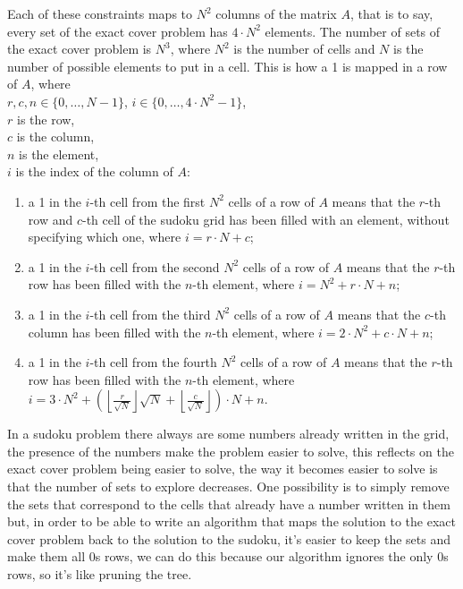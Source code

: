 \documentclass{beamer}
\begin{document}
\begin{frame}
    Each of these constraints maps to $N^2$ columns of the matrix $A$, that is to say,
    every set of the exact cover problem has $4\cdot N^2$ elements.
    The number of sets of the exact cover problem is $N^3$, where $N^2$ is the number of cells
    and $N$ is the number of possible elements to put in a cell.
    This is how a 1 is mapped in a row of $A$, where \\ 
    $r,c,n \in \{0,\dots,N-1\}$, $i \in \{0,\dots,4\cdot N^2-1\}$, \\
    $r$ is the row, \\
    $c$ is the column, \\
    $n$ is the element, \\
    $i$ is the index of the column of $A$:
\end{frame}
\begin{frame}    
    \begin{enumerate}
        \item a 1 in the $i$-th cell from the first $N^2$ cells of a row of $A$ means that
        the $r$-th row and $c$-th cell of the sudoku grid has been filled with an element, without specifying which one,
        where $i = r\cdot N + c$;
        \item a 1 in the $i$-th cell from the second $N^2$ cells of a row of $A$ means that
        the $r$-th row has been filled with the $n$-th element, where $i = N^2 + r\cdot N + n$;
        \item a 1 in the $i$-th cell from the third $N^2$ cells of a row of $A$ means that
        the $c$-th column has been filled with the $n$-th element, 
        where $i = 2\cdot N^2 + c\cdot N + n$;
        \item a 1 in the $i$-th cell from the fourth $N^2$ cells of a row of $A$ means that
        the $r$-th row has been filled with the $n$-th element,
        where $i = 3\cdot N^2 + \left(\left\lfloor\frac{r}{\sqrt{N}}\right\rfloor \sqrt{N}
        + \left\lfloor\frac{c}{\sqrt{N}}\right\rfloor\right)\cdot N + n$.
    \end{enumerate}
\end{frame}
\begin{frame}{}
    In a sudoku problem there always are some numbers already written in the grid,
    the presence of the numbers make the problem easier to solve, this reflects on the 
    exact cover problem being easier to solve, the way it becomes easier to solve is that
    the number of sets to explore decreases. One possibility is to simply remove the 
    sets that correspond to the cells that already have a number written in them but,
    in order to be able to write an algorithm that maps the solution to the exact cover problem 
    back to the solution to the sudoku, it's easier to keep the sets and make them all 0s rows,
    we can do this because our algorithm ignores the only 0s rows, so it's like pruning the tree.
\end{frame}
\end{document}
